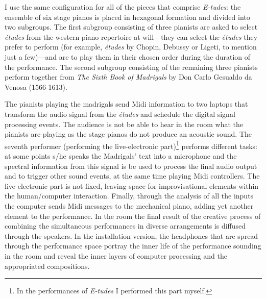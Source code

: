 I use the same configuration for all of the pieces that comprise \emph{E-tudes}: the ensemble of six stage pianos is placed in hexagonal formation and divided into two subgroups. The first subgroup consisting of three pianists are asked to select \emph{\'{e}tudes} from the western piano repertoire at will---they can select the \emph{\'{e}tudes} they prefer to perform (for example, \emph{\'{e}tudes} by Chopin, Debussy or Ligeti, to mention just a few)---and are to play them in their chosen order during the duration of the performance. The second subgroup consisting of the remaining three pianists perform together from \emph{The Sixth Book of Madrigals} by Don Carlo Gesualdo da Venosa (1566-1613). 

The pianists playing the madrigals send Midi information to two laptops that transform the audio signal from the \emph{\'{e}tudes} and schedule the digital signal processing events. The audience is not be able to hear in the room what the pianists are playing as the stage pianos do not produce an acoustic sound. The seventh performer (performing the live-electronic part)\footnote{In the performances of \emph{E-tudes} I performed this part myself.} performs different tasks: at some points s/he speaks the Madrigals' text into a microphone and the spectral information from this signal is be used to process the final audio output and to trigger other sound events, at the same time playing Midi controllers. The live electronic part is not fixed, leaving space for improvisational elements within the human/computer interaction. Finally, through the analysis of all the inputs the computer sends Midi messages to the mechanical piano, adding yet another element to the performance. In the room the final result of the creative process of combining the simultaneous performances in diverse arrangements is diffused through the speakers. In the installation version, the headphones that are spread through the performance space portray the inner life of the performance sounding in the room and reveal the inner layers of computer processing and the appropriated compositions.

